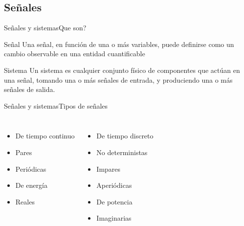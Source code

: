  \subsection{Señales}
 \begin{frame}{Señales y sistemas}{Que son?}
    \begin{block}{Señal}
       Una señal, en función de una o más variables, puede definirse como un cambio observable en una entidad cuantificable
    \end{block}
    \begin{block}{Sistema}
       Un sistema es cualquier conjunto físico de componentes que actúan en una señal, tomando una o más señales de entrada, y produciendo una o más señales de salida.
    \end{block}
 \end{frame}
 \begin{frame}{Señales y sistemas}{Tipos de señales}
    \begin{columns}[onlytextwidth]
       \begin{itemize}
          \item{De tiempo continuo}
          \item{Pares}
          \item{Periódicas}
          \item{De energía}
          \item{Reales}
       \end{itemize}
       \begin{itemize}
          \item{De tiempo discreto}
          \item{No deterministas}
          \item{Impares}
          \item{Aperiódicas}
          \item{De potencia}
          \item{Imaginarias}
       \end{itemize}
    \end{columns}
 \end{frame}
